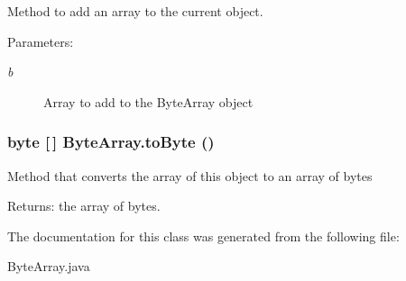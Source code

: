Method to add an array to the current object. \begin{Desc}
\item[Parameters:]
\begin{description}
\item[{\em b}]Array to add to the Byte\-Array object \end{description}
\end{Desc}
\hypertarget{class_byte_array_c2}{
\subsubsection[toByte]{\setlength{\rightskip}{0pt plus 5cm}byte \mbox{[}$\,$\mbox{]} Byte\-Array.to\-Byte ()}}
\label{class_byte_array_c2}


Method that converts the array of this object to an array of bytes \begin{Desc}
\item[Returns:]the array of bytes. \end{Desc}


The documentation for this class was generated from the following file:\begin{CompactItemize}
\item 
Byte\-Array.java\end{CompactItemize}
